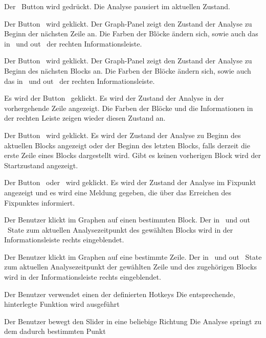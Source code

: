 {Der \faPause\ Button wird gedrückt.}
{Die Analyse pausiert im aktuellen Zustand.}

{Der Button \faForward\ wird geklickt.}
{Der Graph-Panel zeigt den Zustand der Analyse zu Beginn der nächsten Zeile an. Die Farben der Blöcke ändern sich, sowie auch das \glqq in \grqq\ und \glqq out \grqq\ der rechten Informationsleiste.}

{Der Button \faFastForward\ wird geklickt.}
{Der Graph-Panel zeigt den Zustand der Analyse zu Beginn des nächsten Blocks an. Die Farben der Blöcke ändern sich, sowie auch das \glqq in \grqq\ und \glqq out \grqq\ der rechten Informationsleiste.}

{Es wird der Button \faBackward\ geklickt.}
{Es wird der Zustand der Analyse in der vorhergehende Zeile angezeigt. Die Farben der Blöcke und die Informationen in der rechten Leiste zeigen wieder diesen Zustand an.}

{Der Button \faFastBackward\ wird geklickt.}
{Es wird der Zustand der Analyse zu Beginn des aktuellen Blocks angezeigt oder der Beginn des letzten Blocks, falls derzeit die erste Zeile eines Blocks dargestellt wird. Gibt es keinen vorherigen Block wird der Startzustand angezeigt.}

{Der Button \faForward\ oder \faFastForward\ wird geklickt.}
{Es wird der Zustand der Analyse im Fixpunkt angezeigt und es wird eine Meldung gegeben, die über das Erreichen des Fixpunktes informiert.}



{Der Benutzer klickt im Graphen auf einen bestimmten Block.}
{Der \glqq in \grqq\ und \glqq out \grqq\ State zum aktuellen Analysezeitpunkt des gewählten Blocks wird in der Informationsleiste rechts eingeblendet.}

{Der Benutzer klickt im Graphen auf eine bestimmte Zeile.}
{Der \glqq in \grqq\ und \glqq out \grqq\ State zum aktuellen Analysezeitpunkt der gewählten Zeile und des zugehörigen Blocks wird in der Informationsleiste rechts eingeblendet.}

{Der Benutzer verwendet einen der definierten Hotkeys}
{Die entsprechende, hinterlegte Funktion wird ausgeführt}


{Der Benutzer bewegt den Slider in eine beliebige Richtung}
{Die Analyse springt zu dem dadurch bestimmten Punkt}